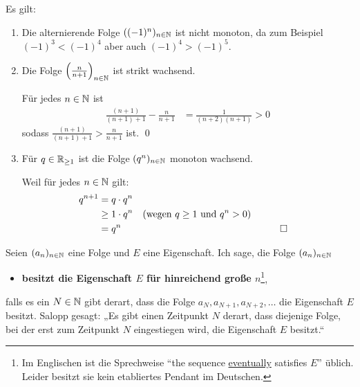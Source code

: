 \begin{bsp}
Es gilt:
    \begin{enumerate}
        \item Die alternierende Folge $((-1)^n)_{n\in \mathbb N}$ ist nicht monoton, da zum Beispiel $(-1)^3< (-1)^4$ aber auch $(-1)^4>(-1)^5$.
        \item Die Folge $\left(\frac{n}{n+1}\right)_{n\in \mathbb N}$ ist strikt wachsend.
        \begin{bew}
            Für jedes $n\in \mathbb N$ ist
            \begin{align*}
                \frac{(n+1)}{(n+1)+1} - \frac{n}{n+1} & = \frac{1}{(n+2)(n+1)} >0
            \end{align*}
            sodass $\frac{(n+1)}{(n+1)+1} > \frac{n}{n+1}$ ist. \qed
        \end{bew}
        \item Für $q\in \mathbb R_{\ge 1}$ ist die Folge $(q^n)_{n\in \mathbb N}$ monoton wachsend.
        \begin{bew}
            Weil für jedes $n\in \mathbb N$ gilt:
            \begin{align*}
                q^{n+1} & = q \cdot q^n \\
                & \ge 1 \cdot q^n && (\text{wegen $q\ge 1$ und $q^n>0$})\\
                & = q^n &&&& \qed
            \end{align*}
        \end{bew}
    \end{enumerate}
\end{bsp}


\begin{defin}[``eventually''] \label{def:eventually} 
    Seien $(a_n)_{n\in \mathbb N}$ eine Folge und $E$ eine Eigenschaft. Ich sage, die Folge $(a_n)_{n\in \mathbb N}$
    \begin{itemize}
        \item[] \textbf{besitzt die Eigenschaft $E$ für hinreichend große $n$}\footnote{Im Englischen ist die Sprechweise ``the sequence \href{https://en.wikipedia.org/wiki/Eventually_(mathematics)}{eventually} satisfies $E$'' üblich. Leider besitzt sie kein etabliertes Pendant im Deutschen.},
    \end{itemize}
    falls es ein $N\in \mathbb N$ gibt derart, dass die Folge $a_N,a_{N+1},a_{N+2},\dots$ die Eigenschaft $E$ besitzt. Salopp gesagt: „Es gibt einen Zeitpunkt $N$ derart, dass diejenige Folge, bei der erst zum Zeitpunkt $N$ eingestiegen wird, die Eigenschaft $E$ besitzt.“
\end{defin}


